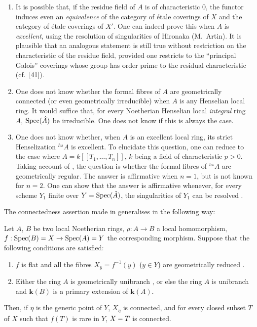 \begin{remarks}[18.9.6]
\label{IV.18.9.6}
\begin{enumerate}[label=\emph{\roman*)}]
  \item It is possible that, if the residue field of $A$ is of characteristic 0, the functor  induces even an \emph{equivalence} of the category of \'{e}tale coverings of $X$ and the category of \'{e}tale coverings of $X'$.
  One can indeed prove this when $A$ is \emph{excellent}, using the resolution of singularities of Hironaka (M.~Artin).
  It is plausible that an analogous statement is still true without restriction on the characteristic of the residue field, provided one restricts to the ``principal Galois'' coverings whose group has order prime to the residual characteristic (cf.~[41]).

  \item One does not know whether the formal fibres of $A$ are geometrically connected (or even geometrically irreducible) when $A$ is any Henselian local ring.
  It would suffice that, for every Noetherian Henselian local \emph{integral} ring $A$, $\operatorname{Spec}(\hat{A})$ be irreducible.
  One does not know if this is always the case.

  \item One does not know whether, when $A$ is an excellent local ring, its strict Henselization ${}^{hs}\!A$ is excellent.
  To elucidate this question, one can reduce to the case where $A=k[[T_1,\ldots,T_n]]$, $k$ being a field of characteristic $p>0$.
  Taking account of , the question is whether the formal fibres of ${}^{hs}\!A$ are geometrically regular.
  The answer is affirmative when $n=1$, but is not known for $n=2$.
  One can show that the answer is affirmative whenever, for every scheme $Y_1$ finite over $Y=\operatorname{Spec}(\hat{A})$, the singularities of $Y_1$ can be resolved .
\end{enumerate}
\end{remarks}

The connectedness assertion made in  generalises in the following way:

\begin{theorem}[18.9.7]
\label{IV.18.9.7}
Let $A$, $B$ be two local Noetherian rings, $\rho:A\to B$ a local homomorphism, $f:\operatorname{Spec}(B)=X\to\operatorname{Spec}(A)=Y$ the corresponding morphism.
Suppose that the following conditions are satisfied:
\begin{enumerate}[label=\emph{\roman*)}]
  \item $f$ is flat and all the fibres $X_y=f^{-1}(y)$ \textup{(}$y\in Y$\textup{)} are geometrically reduced .
  \item \textup{Either} the ring $A$ is geometrically unibranch \textup{, or else} the ring $A$ is unibranch  and $\boldsymbol{k}(B)$ is a primary extension  of $\boldsymbol{k}(A)$.
\end{enumerate}
Then, if $\eta$ is the generic point of $Y$, $X_\eta$ is connected, and for every closed subset $T$ of $X$ such that $f(T)$ is rare in $Y$, $X- T$ is connected.
\end{theorem}


